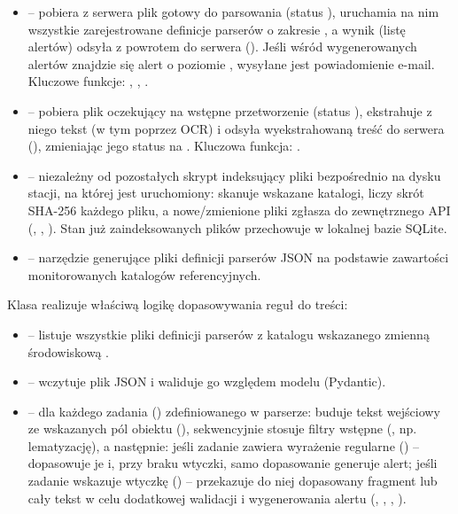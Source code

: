 \begin{itemize}[leftmargin=1.6em]
  \item \textbf{} -- pobiera z serwera plik gotowy do parsowania
        (status ), uruchamia na nim wszystkie zarejestrowane definicje
        parserów o zakresie , a wynik (listę alertów) odsyła z powrotem
        do serwera (). Jeśli wśród wygenerowanych alertów znajdzie się
        alert o poziomie , wysyłane jest powiadomienie e-mail. Kluczowe funkcje:
        , , .
  \item \textbf{} -- pobiera plik oczekujący na wstępne przetworzenie
        (status ), ekstrahuje z niego tekst (w tym poprzez OCR) i odsyła
        wyekstrahowaną treść do serwera (), zmieniając jego status na
        . Kluczowa funkcja: .
  \item \textbf{} -- niezależny od pozostałych skrypt indeksujący pliki
        bezpośrednio na dysku stacji, na której jest uruchomiony: skanuje wskazane katalogi, liczy
        skrót SHA-256 każdego pliku, a nowe/zmienione pliki zgłasza do zewnętrznego API
        (, , ). Stan już zaindeksowanych
        plików przechowuje w lokalnej bazie SQLite.
  \item \textbf{} -- narzędzie generujące pliki definicji
        parserów JSON na podstawie zawartości monitorowanych katalogów referencyjnych.
\end{itemize}


Klasa  realizuje właściwą logikę dopasowywania reguł do treści:

\begin{itemize}[leftmargin=1.6em]
  \item {} -- listuje wszystkie pliki definicji parserów z katalogu
        wskazanego zmienną środowiskową .
  \item {} -- wczytuje plik JSON i waliduje go względem modelu
         (Pydantic).
  \item {} -- dla każdego zadania () zdefiniowanego
        w parserze: buduje tekst wejściowy ze wskazanych pól obiektu (),
        sekwencyjnie stosuje filtry wstępne (, np. lematyzację), a następnie:
        jeśli zadanie zawiera wyrażenie regularne () -- dopasowuje je i, przy braku
        wtyczki, samo dopasowanie generuje alert; jeśli zadanie wskazuje wtyczkę ()
        -- przekazuje do niej dopasowany fragment lub cały tekst w celu dodatkowej walidacji
        i wygenerowania alertu (, , , ).
\end{itemize}

